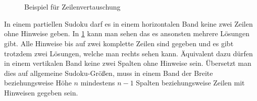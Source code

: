 \begin{figure}[H]
\begin{minipage}{0.48\textwidth}
        \\
        \\

    \end{minipage}
    \caption{Beispiel für Zeilenvertauschung}
    \label{fig:row_constraints}
\end{figure}

In einem partiellen Sudoku darf es in einem horizontalen Band keine zwei Zeilen ohne Hinweise geben.
In \cref{fig:row_constraints} kann man sehen das es ansonsten mehrere Lösungen gibt.
Alle Hinweise bis auf zwei komplette Zeilen sind gegeben und es gibt trotzdem zwei Lösungen, welche man rechts sehen kann.
Äquivalent dazu dürfen in einem vertikalen Band keine zwei Spalten ohne Hinweise sein.
Übersetzt man dies auf allgemeine Sudoku-Größen,
muss in einem Band der Breite beziehungsweise Höhe $n$ mindestens $n-1$ Spalten beziehungsweise Zeilen mit Hinweisen gegeben sein.
